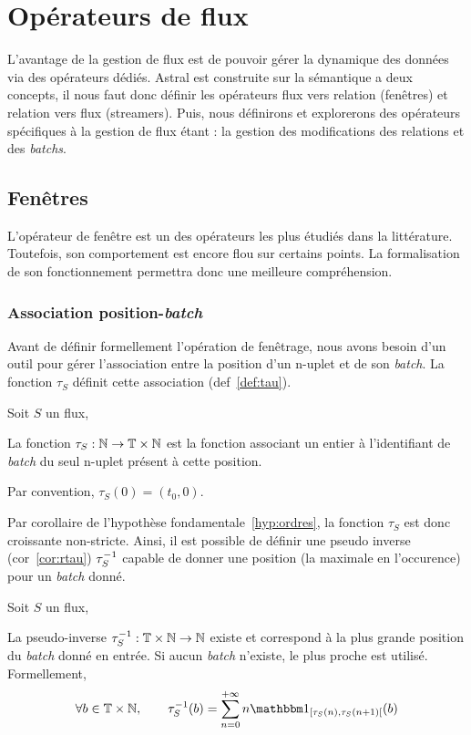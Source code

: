 \section{Opérateurs de flux}\label{sec:contrib:astral:flux}
L'avantage de la gestion de flux est de pouvoir gérer la dynamique des données via des opérateurs dédiés. Astral est construite sur la sémantique a deux concepts, il nous faut donc définir les opérateurs flux vers relation (fenêtres) et relation vers flux (streamers). Puis, nous définirons et explorerons des opérateurs spécifiques à la gestion de flux étant : la gestion des modifications des relations et des \textit{batchs}.
\subsection{Fenêtres}
L'opérateur de fenêtre est un des opérateurs les plus étudiés dans la littérature. Toutefois, son comportement est encore flou sur certains points. La formalisation de son fonctionnement permettra donc une meilleure compréhension.
\subsubsection{Association position-\textit{batch}}
Avant de définir formellement l'opération de fenêtrage, nous avons besoin d'un outil pour gérer l'association entre la position d'un n-uplet et de son \textit{batch}. La fonction $\tau_S$ définit cette association (def~\ref{def:tau}). 
\begin{defi}\label{def:tau}
    Soit $S$ un flux,

    La fonction $\tau_S : \mathbb{N}\to \mathbb{T}\times\mathbb{N}$ est la fonction associant un entier à l'identifiant de \textit{batch} du seul n-uplet présent à cette position.

    Par convention, $\tau_S(0)=(t_0,0)$.
\end{defi}

Par corollaire de l'hypothèse fondamentale~\ref{hyp:ordres}, la fonction $\tau_S$ est donc croissante non-stricte. Ainsi, il est possible de définir une pseudo inverse (cor~\ref{cor:rtau}) $\tau^{-1}_S$ capable de donner une position (la maximale en l'occurence) pour un \textit{batch} donné.
\begin{coro}\label{cor:rtau}
    Soit $S$ un flux,

    La pseudo-inverse $\tau^{-1}_S:\mathbb{T}\times\mathbb{N}\to \mathbb{N}$ existe et correspond à la plus grande position du \textit{batch} donné en entrée. Si aucun \textit{batch} n'existe, le plus proche est utilisé. Formellement, $$\forall b \in \TN, \qquad \tau_S^{-1}(b) = \sum_{n=0}^{+\infty} n \indic_{[\tau_S(n),\tau_S(n+1)[}(b)$$
\end{coro}

